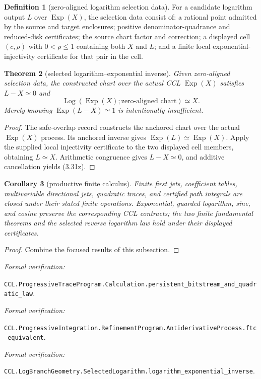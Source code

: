 \documentclass[10pt]{article}
\newtheorem{theorem}{Theorem}[section]
\newtheorem{corollary}[theorem]{Corollary}
\theoremstyle{definition}
\newtheorem{definition}[theorem]{Definition}
\theoremstyle{remark}
\newcommand{\leanref}[1]{\par\smallskip\noindent
  \emph{Formal verification:}\par\nobreak
  {\raggedright\nolinkurl{#1}.\par}}
\begin{document}
\begin{definition}[zero-aligned logarithm selection data]
For a candidate logarithm output $L$ over $\operatorname{Exp}(X)$, the
selection data consist of: a rational point admitted by the source and target
enclosures; positive denominator-quadrance and reduced-disk certificates; the
source chart factor and correction; a displayed cell $(c,\rho)$ with
$0<\rho\le1$ containing both $X$ and $L$; and a finite local
exponential-injectivity certificate for that pair in the cell.
\end{definition}

\begin{theorem}[selected logarithm--exponential inverse]
Given zero-aligned selection data, the constructed chart over the actual CCL
$\operatorname{Exp}(X)$ satisfies $L-X\simeq0$ and
\[
 \operatorname{Log}(\operatorname{Exp}(X);\text{zero-aligned chart})\simeq X.
 \tag{3.31z}
\]
Merely knowing $\operatorname{Exp}(L-X)\simeq1$ is intentionally
insufficient.
\end{theorem}

\begin{proof}
The safe-overlap record constructs the anchored chart over the actual
$\operatorname{Exp}(X)$ process.  Its anchored inverse gives
$\operatorname{Exp}(L)\simeq\operatorname{Exp}(X)$.  Apply the supplied local
injectivity certificate to the two displayed cell members, obtaining
$L\simeq X$.  Arithmetic congruence gives $L-X\simeq0$, and additive
cancellation yields (3.31z).
\end{proof}

\begin{corollary}[productive finite calculus]
\label{thm:productive-finite-calculus}
Finite first jets, coefficient tables, multivariable directional jets,
quadratic traces, and certified path integrals are closed under their stated
finite operations.  Exponential, guarded logarithm, sine, and cosine preserve
the corresponding CCL contracts; the two finite fundamental theorems and the
selected reverse logarithm law hold under their displayed certificates.
\end{corollary}

\begin{proof}
Combine the focused results of this subsection.
\end{proof}

\leanref{CCL.ProgressiveTraceProgram.Calculation.persistent_bitstream_and_quadratic_law}
\leanref{CCL.ProgressiveIntegration.RefinementProgram.AntiderivativeProcess.ftc_equivalent}
\leanref{CCL.LogBranchGeometry.SelectedLogarithm.logarithm_exponential_inverse}
\end{document}
